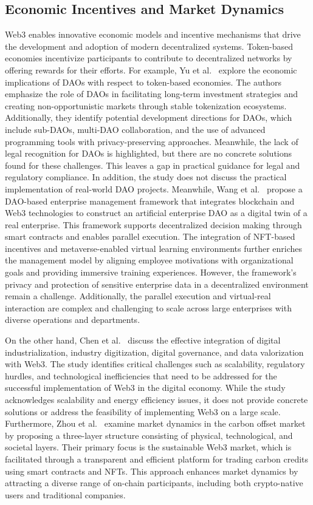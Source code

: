 \documentclass[5p,twocolumn]{elsarticle}
\begin{document}
\subsection{Economic Incentives and Market Dynamics}
Web3 enables innovative economic models and incentive mechanisms that drive the development and adoption of modern decentralized systems. Token-based economies incentivize participants to contribute to decentralized networks by offering rewards for their efforts. For example, Yu et al.~\cite{yu2023leveraging} explore the economic implications of DAOs with respect to token-based economies. The authors emphasize the role of DAOs in facilitating long-term investment strategies and creating non-opportunistic markets through stable tokenization ecosystems. Additionally, they identify potential development directions for DAOs, which include sub-DAOs, multi-DAO collaboration, and the use of advanced programming tools with privacy-preserving approaches. Meanwhile, the lack of legal recognition for DAOs is highlighted, but there are no concrete solutions found for these challenges. This leaves a gap in practical guidance for legal and regulatory compliance. In addition, the study does not discuss the practical implementation of real-world DAO projects. Meanwhile, Wang et al.~\cite{wang2023novel} propose a DAO-based enterprise management framework that integrates blockchain and Web3 technologies to construct an artificial enterprise DAO as a digital twin of a real enterprise. This framework supports decentralized decision making through smart contracts and enables parallel execution. The integration of NFT-based incentives and metaverse-enabled virtual learning environments further enriches the management model by aligning employee motivations with organizational goals and providing immersive training experiences. However, the framework's privacy and protection of sensitive enterprise data in a decentralized environment remain a challenge. Additionally, the parallel execution and virtual-real interaction are complex and challenging to scale across large enterprises with diverse operations and departments.

On the other hand, Chen et al.~\cite{chen2022when} discuss the effective integration of digital industrialization, industry digitization, digital governance, and data valorization with Web3. The study identifies critical challenges such as scalability, regulatory hurdles, and technological inefficiencies that need to be addressed for the successful implementation of Web3 in the digital economy. While the study acknowledges scalability and energy efficiency issues, it does not provide concrete solutions or address the feasibility of implementing Web3 on a large scale. Furthermore, Zhou et al.~\cite{zhou2023harnessing} examine market dynamics in the carbon offset market by proposing a three-layer structure consisting of physical, technological, and societal layers. Their primary focus is the sustainable Web3 market, which is facilitated through a transparent and efficient platform for trading carbon credits using smart contracts and NFTs. This approach enhances market dynamics by attracting a diverse range of on-chain participants, including both crypto-native users and traditional companies.
\end{document}
